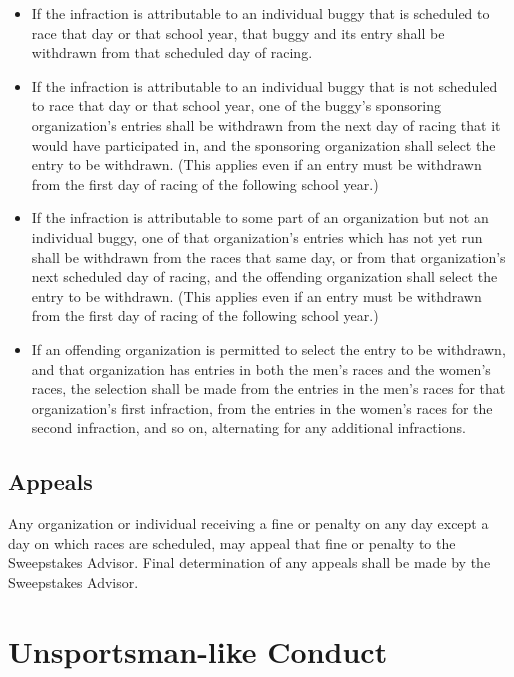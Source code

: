 	\begin{itemize}

		\item
		If the infraction is attributable to an individual buggy that is scheduled to race that day or that school year, that buggy and its entry shall be withdrawn from that scheduled day of racing.

		\item
		If the infraction is attributable to an individual buggy that is not scheduled to race that day or that school year, one of the buggy's sponsoring organization's entries shall be withdrawn from the next day of racing that it would have participated in, and the sponsoring organization shall select the entry to be withdrawn. (This applies even if an entry must be withdrawn from the first day of racing of the following school year.)

		\item
		If the infraction is attributable to some part of an organization but not an individual buggy, one of that organization's entries which has not yet run shall be withdrawn from the races that same day, or from that organization's next scheduled day of racing, and the offending organization shall select the entry to be withdrawn. (This applies even if an entry must be withdrawn from the first day of racing of the following school year.)

		\item
		If an offending organization is permitted to select the entry to be withdrawn, and that organization has entries in both the men's races and the women's races, the selection shall be made from the entries in the men's races for that organization's first infraction, from the entries in the women's races for the second infraction, and so on, alternating for any additional infractions.

	\end{itemize}

\subsection{Appeals}

	Any organization or individual receiving a fine or penalty on any day except a day on which races are scheduled, may appeal that fine or penalty to the Sweepstakes Advisor. Final determination of any appeals shall be made by the Sweepstakes Advisor.

\section{Unsportsman-like Conduct}

